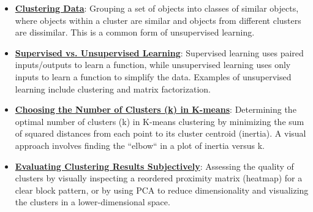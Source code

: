\documentclass{article}%
\begin{document}
\begin{itemize}[leftmargin=*]%
\item \href{https://purdue.brightspace.com/d2l/common/assets/pdfjs-d2l-dist/1.0.14-legacy/web/viewer.html?file=\%2Fcontent\%2Fenforced\%2F1095467-wl.202510.CS.24300.001\%2F12L2-distance-clusters.pdf\%3Fou\%3D1095467\&lang=en-us\&container=d2l-fileviewer-rendered-pdf\&fullscreen=d2l-fileviewer-rendered-pdf-dialog\&height=667#page=4}{\textbf{Clustering Data}}: Grouping a set of objects into classes of similar objects, where objects within a cluster are similar and objects from different clusters are dissimilar. This is a common form of unsupervised learning.%
\item \href{https://purdue.brightspace.com/d2l/common/assets/pdfjs-d2l-dist/1.0.14-legacy/web/viewer.html?file=\%2Fcontent\%2Fenforced\%2F1095467-wl.202510.CS.24300.001\%2F12L2-distance-clusters.pdf\%3Fou\%3D1095467\&lang=en-us\&container=d2l-fileviewer-rendered-pdf\&fullscreen=d2l-fileviewer-rendered-pdf-dialog\&height=667#page=3}{\textbf{Supervised vs. Unsupervised Learning}}: Supervised learning uses paired inputs/outputs to learn a function, while unsupervised learning uses only inputs to learn a function to simplify the data. Examples of unsupervised learning include clustering and matrix factorization.%
\item \href{https://purdue.brightspace.com/d2l/common/assets/pdfjs-d2l-dist/1.0.14-legacy/web/viewer.html?file=\%2Fcontent\%2Fenforced\%2F1095467-wl.202510.CS.24300.001\%2F12L2-distance-clusters.pdf\%3Fou\%3D1095467\&lang=en-us\&container=d2l-fileviewer-rendered-pdf\&fullscreen=d2l-fileviewer-rendered-pdf-dialog\&height=667#page=33}{\textbf{Choosing the Number of Clusters (k) in K{-}means}}: Determining the optimal number of clusters (k) in K-means clustering by minimizing the sum of squared distances from each point to its cluster centroid (inertia). A visual approach involves finding the ``elbow`` in a plot of inertia versus k.%
\item \href{https://purdue.brightspace.com/d2l/common/assets/pdfjs-d2l-dist/1.0.14-legacy/web/viewer.html?file=\%2Fcontent\%2Fenforced\%2F1095467-wl.202510.CS.24300.001\%2F12L2-distance-clusters.pdf\%3Fou\%3D1095467\&lang=en-us\&container=d2l-fileviewer-rendered-pdf\&fullscreen=d2l-fileviewer-rendered-pdf-dialog\&height=667#page=38}{\textbf{Evaluating Clustering Results Subjectively}}: Assessing the quality of clusters by visually inspecting a reordered proximity matrix (heatmap) for a clear block pattern, or by using PCA to reduce dimensionality and visualizing the clusters in a lower-dimensional space.%

\end{itemize}
\end{document}
